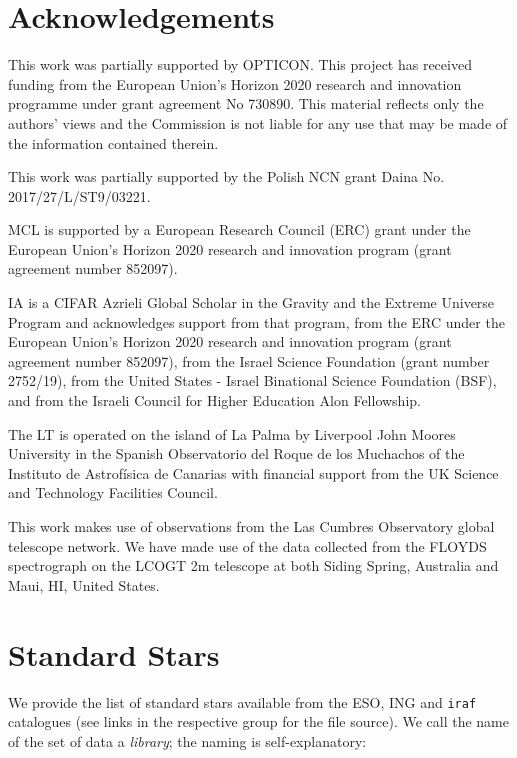 \documentclass[fleqn,usenatbib]{mnras}
\begin{document}
\section*{Acknowledgements}
This work was partially supported by OPTICON. This project has
received funding from the European Union's Horizon 2020 research and
innovation programme under grant agreement No 730890. This material
reflects only the authors' views and the Commission is not liable for
any use that may be made of the information contained therein.

This work was partially supported by the Polish NCN grant Daina
No. 2017/27/L/ST9/03221.

MCL is supported by a European Research Council (ERC) grant under the European Union's Horizon 2020 research and innovation program (grant agreement number 852097).

IA is a CIFAR Azrieli Global Scholar in the Gravity and the Extreme Universe Program and acknowledges support from that program, from the ERC under the European Union's Horizon 2020 research and innovation program (grant agreement number 852097), from the Israel Science Foundation (grant number 2752/19), from the United States - Israel Binational Science Foundation (BSF), and from the Israeli Council for Higher Education Alon Fellowship.

The LT is operated on the island of La Palma by Liverpool
John Moores University in the Spanish Observatorio del Roque
de los Muchachos of the Instituto de Astrof{\'i}sica de Canarias with
financial support from the UK Science and Technology Facilities
Council.

This work makes use of observations from the Las Cumbres Observatory
global telescope network. We have made use of the data collected from
the FLOYDS spectrograph on the LCOGT 2m telescope at both Siding Spring,
Australia and Maui, HI, United States.







\appendix

\section{Standard Stars}
\label{appendix:standards}
We provide the list of standard stars available from the ESO, ING and \texttt{iraf} catalogues (see
links in the respective group for the file source). We call the name of the set of
data a \textit{library}; the naming is self-explanatory:
\end{document}

